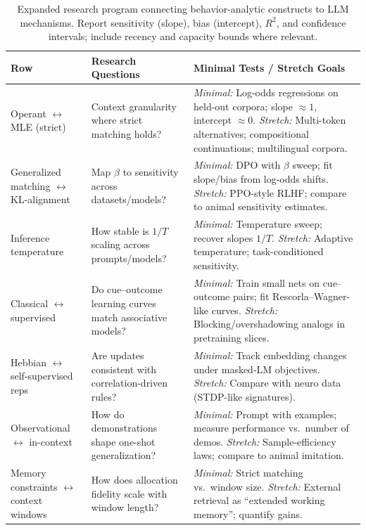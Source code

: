 \documentclass[11pt]{article}
\begin{document}
\begin{table}[h!]
\centering
\begin{tabular}{|p{}|p{}|p{}|}
\hline
\textbf{Row} & \textbf{Research Questions} & \textbf{Minimal Tests / Stretch Goals} \\
\hline
Operant $\leftrightarrow$ MLE (strict) &
Context granularity where strict matching holds? &
\emph{Minimal:} Log-odds regressions on held-out corpora; slope $\approx 1$, intercept $\approx 0$. \newline
\emph{Stretch:} Multi-token alternatives; compositional continuations; multilingual corpora.\\
\hline
Generalized matching $\leftrightarrow$ KL-alignment &
Map $\beta$ to sensitivity across datasets/models? &
\emph{Minimal:} DPO with $\beta$ sweep; fit slope/bias from log-odds shifts. \newline
\emph{Stretch:} PPO-style RLHF; compare to animal sensitivity estimates.\\
\hline
Inference temperature &
How stable is $1/T$ scaling across prompts/models? &
\emph{Minimal:} Temperature sweep; recover slopes $1/T$. \newline
\emph{Stretch:} Adaptive temperature; task-conditioned sensitivity.\\
\hline
Classical $\leftrightarrow$ supervised &
Do cue–outcome learning curves match associative models? &
\emph{Minimal:} Train small nets on cue–outcome pairs; fit Rescorla–Wagner-like curves. \newline
\emph{Stretch:} Blocking/overshadowing analogs in pretraining slices.\\
\hline
Hebbian $\leftrightarrow$ self-supervised reps &
Are updates consistent with correlation-driven rules? &
\emph{Minimal:} Track embedding changes under masked-LM objectives. \newline
\emph{Stretch:} Compare with neuro data (STDP-like signatures).\\
\hline
Observational $\leftrightarrow$ in-context &
How do demonstrations shape one-shot generalization? &
\emph{Minimal:} Prompt with examples; measure performance vs.\ number of demos. \newline
\emph{Stretch:} Sample-efficiency laws; compare to animal imitation.\\
\hline
Memory constraints $\leftrightarrow$ context windows &
How does allocation fidelity scale with window length? &
\emph{Minimal:} Strict matching vs.\ window size. \newline
\emph{Stretch:} External retrieval as “extended working memory”; quantify gains.\\
\hline
\end{tabular}
\caption{Expanded research program connecting behavior-analytic constructs to LLM mechanisms. Report sensitivity (slope), bias (intercept), $R^2$, and confidence intervals; include recency and capacity bounds where relevant.}
\label{tab:program}
\end{table}
\end{document}
